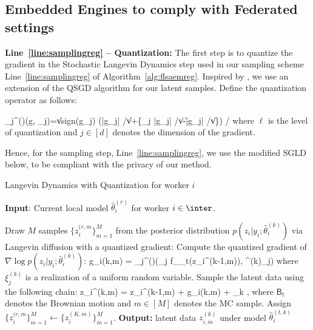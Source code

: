 \documentclass[11pt]{article}
\theoremstyle{t}
\begin{document}
\subsection{Embedded Engines to comply with Federated settings}

\textbf{Line~\ref{line:samplingreg} -- Quantization:} 
The first step is to quantize the gradient in the Stochastic Langevin Dynamics step used in our sampling scheme Line~\ref{line:samplingreg} of Algorithm~\ref{alg:flsaemreg}.
Inspired by \citep{alistarh2017qsgd}, we use an extension of the QSGD algorithm for our latent samples.
Define the quantization operator as follows:

\beq\label{eq:operator}
_{j}^{(\ell)}\left(g, \xi_{j}\right)=\|v\| \cdot \textrm{sign}\left(g_{j}\right) \cdot\left(\left\lfloor \ell \left|g_{j}\right| /\|v\|\right\rfloor+\left\{\xi_{j} \leq \ell \left|g_{j}\right| /\|v\|-\left\lfloor \ell \left|g_{j}\right| /\|v\|\right\rfloor\right\}\right) /\ell
\eeq
where $\ell$ is the level of quantization and $j \in [d]$ denotes the dimension of the gradient.

Hence, for the sampling step, Line~\ref{line:samplingreg}, we use the modified SGLD below, to be compliant with the privacy of our method.
\begin{algorithm}[H]
\caption{Langevin Dynamics with Quantization for worker $i$} \label{alg:quant}
\begin{algorithmic}[1]
\STATE \textbf{Input}: Current local model $\hat{\theta}^{(r)}_i$ for worker $i \in \inter$.

\STATE Draw $M$ samples $\{ z_{i}^{(r,m} \}_{m=1}^M$ from the posterior distribution $p(z_i| y_i; \hat{\theta}^{(k)}_i)$ via Langevin diffusion with a quantized gradient:\label{line:langevin}
\STATE Compute the quantized gradient of $\nabla \log p(z_i| y_i; \hat{\theta}^{(k)}_i)$:
\beq\label{eq:grad}
g_i{(k,m)} = _{j}^{(\ell)}\left(\nabla_j f_{\theta_t}(z_i^{(k-1,m)}), \xi^{(k)}_{j}\right)
\eeq
where $\xi^{(k)}_{j}$ is a realization of a uniform random variable.
\STATE Sample the latent data using the following chain:
\beq\label{eq:lang}
z_i^{(k,m)} = z_i^{(k-1,m)} +   g_i{(k,m)} +   _k \eqsp,
\eeq
where $\mathsf{B}_t$ denotes the Brownian motion and $m \in [M]$ denotes the MC sample.
\ENDFOR
\STATE Assign $\{ z_{i}^{(r,m} \}_{m=1}^M \leftarrow \{ z_i^{(K,m)} \}_{m=1}^M$.
\STATE \textbf{Output:} latent data $z_{i,m}^{(k)}$ under model $\hat{\theta}^{(t,k)}_i$ 
\end{algorithmic}
\end{algorithm}
\end{document}
